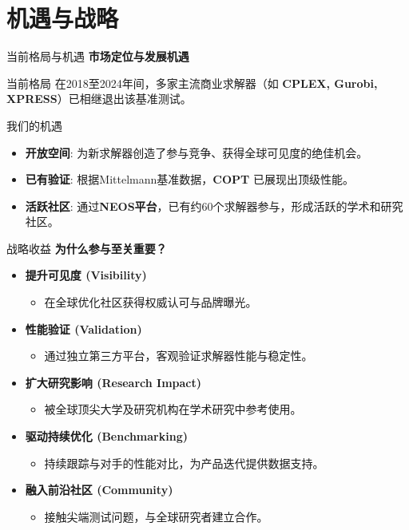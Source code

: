 \documentclass[10pt]{beamer}
\begin{document}
\section{机遇与战略}

\begin{frame}{当前格局与机遇}
  \textbf{市场定位与发展机遇}
  \begin{block}{当前格局}
    在2018至2024年间，多家主流商业求解器（如 \textbf{CPLEX, Gurobi, XPRESS}）已相继退出该基准测试。
  \end{block}
  
  \begin{alertblock}{我们的机遇}
    \begin{itemize}
        \item \textbf{开放空间}: 为新求解器创造了参与竞争、获得全球可见度的绝佳机会。
        \item \textbf{已有验证}: 根据Mittelmann基准数据，\textbf{COPT} 已展现出顶级性能。
        \item \textbf{活跃社区}: 通过\textbf{NEOS平台}，已有约60个求解器参与，形成活跃的学术和研究社区。
    \end{itemize}
  \end{alertblock}
\end{frame}

\begin{frame}[allowframebreaks]{战略收益}
  \textbf{为什么参与至关重要？}
  \begin{itemize}
    \item \textbf{提升可见度 (Visibility)}
      \begin{itemize}
        \item 在全球优化社区获得权威认可与品牌曝光。
      \end{itemize}
    \item \textbf{性能验证 (Validation)}
      \begin{itemize}
        \item 通过独立第三方平台，客观验证求解器性能与稳定性。
      \end{itemize}
    \item \textbf{扩大研究影响 (Research Impact)}
      \begin{itemize}
        \item 被全球顶尖大学及研究机构在学术研究中参考使用。
      \end{itemize}
    \item \textbf{驱动持续优化 (Benchmarking)}
      \begin{itemize}
        \item 持续跟踪与对手的性能对比，为产品迭代提供数据支持。
      \end{itemize}
    \item \textbf{融入前沿社区 (Community)}
      \begin{itemize}
        \item 接触尖端测试问题，与全球研究者建立合作。
      \end{itemize}
  \end{itemize}
\end{frame}
\end{document}
